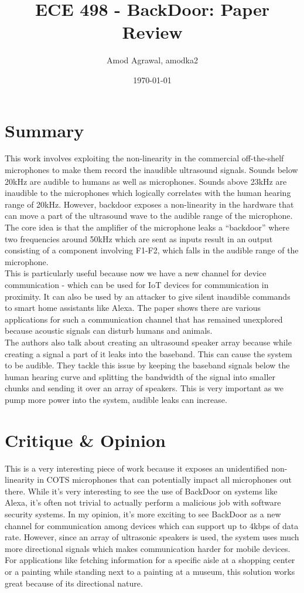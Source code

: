 \documentclass[a4paper]{article}
\title{ECE 498 - BackDoor: Paper Review}
\author{Amod Agrawal, amodka2}
\date{\today}
\begin{document}
\maketitle
\section{Summary}
This work involves exploiting the non-linearity in the commercial off-the-shelf microphones to make them record the inaudible ultrasound signals. Sounds below 20kHz are audible to humans as well as microphones. Sounds above 23kHz are inaudible to the microphones which logically correlates with the human hearing range of 20kHz. However, backdoor exposes a non-linearity in the hardware that can move a part of the ultrasound wave to the audible range of the microphone. The core idea is that the amplifier of the microphone leaks a ``backdoor'' where two frequencies around 50kHz which are sent as inputs result in an output consisting of a component involving F1-F2, which falls in the audible range of the microphone.\\

This is particularly useful because now we have a new channel for device communication - which can be used for IoT devices for communication in proximity. It can also be used by an attacker to give silent inaudible commands to smart home assistants like Alexa. The paper shows there are various applications for such a communication channel that has remained unexplored because acoustic signals can disturb humans and animals. \\

The authors also talk about creating an ultrasound speaker array because while creating a signal a part of it leaks into the baseband. This can cause the system to be audible. They tackle this issue by keeping the baseband signals below the human hearing curve and splitting the bandwidth of the signal into smaller chunks and sending it over an array of speakers. This is very important as we pump more power into the system, audible leaks can increase.\\

\section{Critique \& Opinion}

This is a very interesting piece of work because it exposes an unidentified non-linearity in COTS microphones that can potentially impact all microphones out there. While it's very interesting to see the use of BackDoor on systems like Alexa, it's often not trivial to actually perform a malicious job with software security systems. In my opinion, it's more exciting to see BackDoor as a new channel for communication among devices which can support up to 4kbps of data rate.	However, since an array of ultrasonic speakers is used, the system uses much more directional signals which makes communication harder for mobile devices. For applications like fetching information for a specific aisle at a shopping center or a painting while standing next to a painting at a museum, this solution works great because of its directional nature. \\
\end{document}
